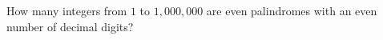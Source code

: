 How many integers from $1$ to $1{,}000{,}000$ are even palindromes with an even number of decimal digits?
